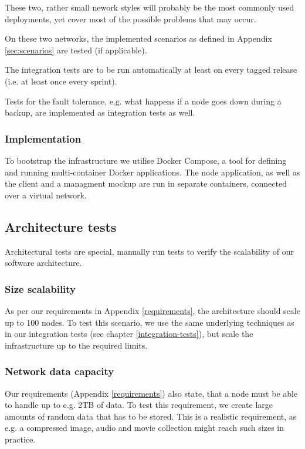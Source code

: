These two, rather small nework styles will probably be the most commonly used deployments, yet cover most of the possible problems that may occur.

On these two networks, the implemented scenarios as defined in Appendix \ref{sec:scenarios} are tested (if applicable).

The integration tests are to be run automatically at least on every tagged release (i.e. at least once every sprint).

Tests for the fault tolerance, e.g. what happens if a node goes down during a backup, are implemented as integration tests as well.

\subsubsection{Implementation}

To bootstrap the infrastructure we utilise Docker Compose, a tool for defining and running multi-container Docker applications\cite{docker-compose}. The node application, as well as the client and a managment mockup are run in separate containers, connected over a virtual network.

\subsection{Architecture tests}

Architectural tests are special, manually run tests to verify the scalability of our software architecture.

\subsubsection{Size scalability}
As per our requirements in Appendix \ref{requirements}, the architecture should scale up to 100 nodes. To test this scenario, we use the same underlying techniques as in our integration tests (see chapter \ref{integration-tests}), but scale the infrastructure up to the required limits.

\subsubsection{Network data capacity}
Our requirements (Appendix \ref{requirements}) also state, that a node must be able to handle up to e.g. 2TB of data. To test this requirement, we create large amounts of random data that has to be stored. This is a realistic requirement, as e.g. a compressed image, audio and movie collection might reach such sizes in practice.
